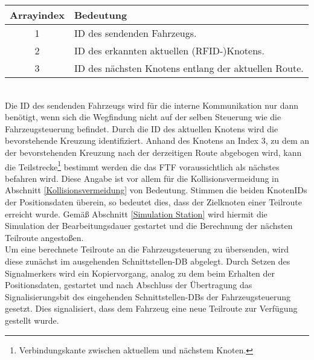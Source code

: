		\begin{tabular}{| c | l |}
			\hline
			\textbf{Arrayindex} & \textbf{Bedeutung} \\ \hline \hline
			1 & ID des sendenden Fahrzeugs. \\ \hline
			2 & ID des erkannten aktuellen (\ac{RFID}-)Knotens. \\ \hline
			3 & ID des nächsten Knotens entlang der aktuellen Route. \\
			\hline
		\end{tabular}\\
		
		Die ID des sendenden Fahrzeugs wird für die interne Kommunikation nur dann benötigt, wenn sich die Wegfindung nicht auf der selben Steuerung wie die Fahrzeugsteuerung befindet. Durch die ID des aktuellen Knotens wird die bevorstehende Kreuzung identifiziert. Anhand des Knotens an Index 3, zu dem an der bevorstehenden Kreuzung nach der derzeitigen Route abgebogen wird, kann die Teilstrecke\footnote{Verbindungskante zwischen aktuellem und nächstem Knoten.} bestimmt werden die das \ac{FTF} voraussichtlich als nächstes befahren wird. Diese Angabe ist vor allem für die Kollisionsvermeidung in Abschnitt \ref{Kollisionsvermeidung} von Bedeutung. Stimmen die beiden KnotenIDs der Positionsdaten überein, so bedeutet dies, dass der Zielknoten einer Teilroute erreicht wurde. Gemäß Abschnitt \ref{Simulation Station} wird hiermit die Simulation der Bearbeitungsdauer gestartet und die Berechnung der nächsten Teilroute angestoßen.
		\\
		Um eine berechnete Teilroute an die Fahrzeugsteuerung zu übersenden, wird diese zunächst im ausgehenden Schnittstellen-\ac{DB} abgelegt. Durch Setzen des Signalmerkers wird ein Kopiervorgang, analog zu dem beim Erhalten der Positionsdaten, gestartet und nach Abschluss der Übertragung das Signalisierungsbit des eingehenden Schnittstellen-{DB}s der Fahrzeugsteuerung gesetzt. Dies signalisiert, dass  dem Fahrzeug eine neue Teilroute zur Verfügung gestellt wurde.
				
